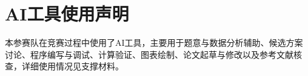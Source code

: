 \section*{AI工具使用声明}
本参赛队在竞赛过程中使用了AI工具，主要用于题意与数据分析辅助、候选方案讨论、程序编写与调试、计算验证、图表绘制、论文起草与修改以及参考文献核查，详细使用情况见支撑材料。
